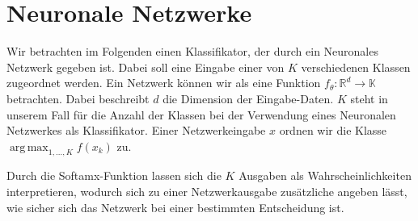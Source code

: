 \documentclass[11pt,a4paper]{article}
\DeclareMathOperator*{\argmax}{arg\,max}
\numberwithin{equation}{section}
\begin{document}

	\newpage
	\section{Neuronale Netzwerke} \label{chapter_nn}
	Wir betrachten im Folgenden einen Klassifikator, der durch ein Neuronales Netzwerk gegeben ist. Dabei soll eine Eingabe einer von $K$ verschiedenen Klassen zugeordnet werden. Ein Netzwerk können wir als eine Funktion $f_\theta : \mathbb{R}^d \to \mathbb{K}$ betrachten. Dabei beschreibt $d$ die Dimension der Eingabe-Daten. $K$ steht in unserem Fall für die Anzahl der Klassen bei der Verwendung eines Neuronalen Netzwerkes als Klassifikator.
	Einer Netzwerkeingabe $x$ ordnen wir die Klasse $\argmax_{1,...,K}f(x_k)$ zu.
	
	Durch die Softamx-Funktion lassen sich die $K$ Ausgaben als Wahrscheinlichkeiten interpretieren, wodurch sich zu einer Netzwerkausgabe zusätzliche angeben lässt, wie sicher sich das Netzwerk bei einer bestimmten Entscheidung ist. 
	
\end{document}

